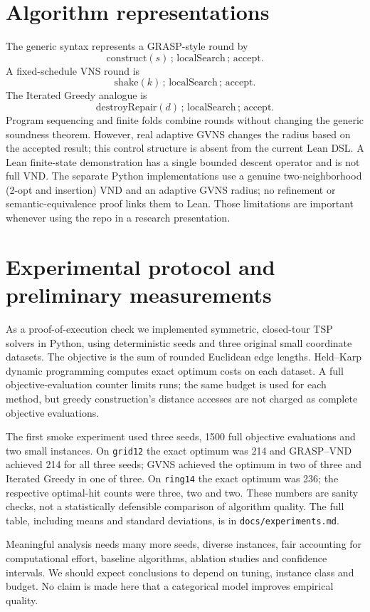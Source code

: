 \documentclass[11pt,a4paper]{article}
\begin{document}
\section{Algorithm representations}
The generic syntax represents a GRASP-style round by
\[\mathrm{construct}(s)\,;\,\mathrm{localSearch}\,;\,\mathrm{accept}.\]
A fixed-schedule VNS round is
\[\mathrm{shake}(k)\,;\,\mathrm{localSearch}\,;\,\mathrm{accept}.\]
The Iterated Greedy analogue is
\[\mathrm{destroyRepair}(d)\,;\,\mathrm{localSearch}\,;\,\mathrm{accept}.\]
Program sequencing and finite folds combine rounds without changing the
generic soundness theorem. However, real adaptive GVNS changes the radius
based on the accepted result; this control structure is absent from the
current Lean DSL. A Lean finite-state demonstration has a single bounded
descent operator and is not full VND. The separate Python implementations
use a genuine two-neighborhood (2-opt and insertion) VND and an adaptive
GVNS radius; no refinement or semantic-equivalence proof links them to
Lean. Those limitations are important whenever using the repo in a
research presentation.

\section{Experimental protocol and preliminary measurements}
As a proof-of-execution check we implemented symmetric, closed-tour TSP
solvers in Python, using deterministic seeds and three original small
coordinate datasets. The objective is the sum of rounded Euclidean edge
lengths. Held--Karp dynamic programming computes exact optimum costs on
each dataset. A full objective-evaluation counter limits runs; the same
budget is used for each method, but greedy construction's distance accesses
are not charged as complete objective evaluations.

The first smoke experiment used three seeds, 1500 full objective evaluations
and two small instances. On \texttt{grid12} the exact optimum was 214 and
GRASP--VND achieved 214 for all three seeds; GVNS achieved the optimum in
two of three and Iterated Greedy in one of three. On \texttt{ring14} the
exact optimum was 236; the respective optimal-hit counts were three, two
and two. These numbers are sanity checks, not a statistically defensible
comparison of algorithm quality. The full table, including means and
standard deviations, is in \texttt{docs/experiments.md}.

Meaningful analysis needs many more seeds, diverse instances, fair accounting
for computational effort, baseline algorithms, ablation studies and
confidence intervals. We should expect conclusions to depend on tuning,
instance class and budget. No claim is made here that a categorical model
improves empirical quality.
\end{document}
